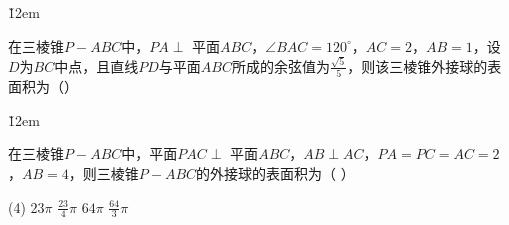 \v{12em}

\begin{example}
    在三棱锥$P - ABC$中，$PA \perp$ 平面$ABC$，$\angle BAC = 120^\circ$，$AC = 2$，$AB = 1$，设$D$为$BC$中点，且直线$PD$与平面$ABC$所成的余弦值为$\frac{\sqrt{5}}{5}$，则该三棱锥外接球的表面积为（\hspace{1.5cm}）
\end{example}

\v{12em}

\begin{example}
    在三棱锥$P - ABC$中，平面$PAC \perp$ 平面$ABC$，$AB \perp AC$，$PA = PC = AC = 2$，$AB = 4$，则三棱锥$P - ABC$的外接球的表面积为（ \hspace{1.5cm}）
    \begin{tasks}(4)
        \task $23\pi$
        \task $\frac{23}{4}\pi$
        \task $64\pi$
        \task $\frac{64}{3}\pi$
    \end{tasks}
\end{example}



